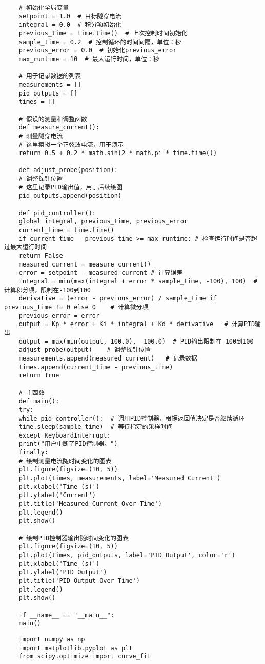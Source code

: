 \documentclass{article}
\begin{document}
\begin{spacing}{1.5}
\begin{lstlisting}
	# 初始化全局变量
	setpoint = 1.0  # 目标隧穿电流
	integral = 0.0  # 积分项初始化
	previous_time = time.time()  # 上次控制时间初始化
	sample_time = 0.2  # 控制循环的时间间隔，单位：秒
	previous_error = 0.0  # 初始化previous_error
	max_runtime = 10  # 最大运行时间，单位：秒
	
	# 用于记录数据的列表
	measurements = []
	pid_outputs = []
	times = []
	
	# 假设的测量和调整函数
	def measure_current():
	# 测量隧穿电流
	# 这里模拟一个正弦波电流，用于演示
	return 0.5 + 0.2 * math.sin(2 * math.pi * time.time())
	
	def adjust_probe(position):
	# 调整探针位置
	# 这里记录PID输出值，用于后续绘图
	pid_outputs.append(position)
	
	def pid_controller():
	global integral, previous_time, previous_error
	current_time = time.time()
	if current_time - previous_time >= max_runtime: # 检查运行时间是否超过最大运行时间
	return False
	measured_current = measure_current()
	error = setpoint - measured_current # 计算误差
	integral = min(max(integral + error * sample_time, -100), 100)  # 计算积分项，限制在-100到100
	derivative = (error - previous_error) / sample_time if previous_time != 0 else 0    # 计算微分项
	previous_error = error
	output = Kp * error + Ki * integral + Kd * derivative   # 计算PID输出
	output = max(min(output, 100.0), -100.0)  # PID输出限制在-100到100
	adjust_probe(output)    # 调整探针位置
	measurements.append(measured_current)   # 记录数据
	times.append(current_time - previous_time)
	return True
	
	# 主函数
	def main():
	try:
	while pid_controller():  # 调用PID控制器，根据返回值决定是否继续循环
	time.sleep(sample_time)  # 等待指定的采样时间
	except KeyboardInterrupt:
	print("用户中断了PID控制器。")
	finally:
	# 绘制测量电流随时间变化的图表
	plt.figure(figsize=(10, 5))
	plt.plot(times, measurements, label='Measured Current')
	plt.xlabel('Time (s)')
	plt.ylabel('Current')
	plt.title('Measured Current Over Time')
	plt.legend()
	plt.show()
	
	# 绘制PID控制器输出随时间变化的图表
	plt.figure(figsize=(10, 5))
	plt.plot(times, pid_outputs, label='PID Output', color='r')
	plt.xlabel('Time (s)')
	plt.ylabel('PID Output')
	plt.title('PID Output Over Time')
	plt.legend()
	plt.show()
	
	if __name__ == "__main__":
	main()
\end{lstlisting}

\clearpage
{}
\begin{lstlisting}
	import numpy as np
	import matplotlib.pyplot as plt
	from scipy.optimize import curve_fit
	

\end{lstlisting}
\end{spacing}
\end{document}
